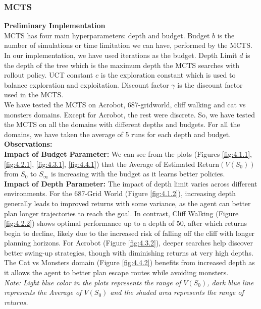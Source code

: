 \documentclass{article}
\begin{document}
\subsubsection{MCTS}
\textbf{Preliminary Implementation}\\

MCTS has four main hyperparameters: depth and budget. 
Budget $b$ is the number of simulations or time limitation we can have, performed by the MCTS. In our implementation, we have used iterations as the budget. 
Depth Limit $d$ is the depth of the tree which is the maximum depth the MCTS searches with rollout policy.
UCT constant $c$ is the exploration constant which is used to balance exploration and exploitation.
Discount factor $\gamma$ is the discount factor used in the MCTS.\\

We have tested the MCTS on Acrobot, 687-gridworld, cliff walking and cat vs monsters domains. Except for Acrobot, the rest were discrete. 
So, we have tested the MCTS on all the domains with different depths and budgets.
For all the domains, we have taken the average of 5 runs for each depth and budget. \\

\textbf{Observations:}\\
\textbf{Impact of Budget Parameter:}
We can see from the plots (Figures \ref{fig:4.1.1}, \ref{fig:4.2.1}, \ref{fig:4.3.1}, \ref{fig:4.4.1}) that the Average of Estimated Return$(V(S_0))$ from $S_0$ to $S_{\infty}$ is increasing with the budget as it learns better policies.\\

\textbf{Impact of Depth Parameter:}
The impact of depth limit varies across different environments. For the 687-Grid World (Figure \ref{fig:4.1.2}), increasing depth generally leads to improved returns with some variance, as the agent can better plan longer trajectories to reach the goal. 
In contrast, Cliff Walking (Figure \ref{fig:4.2.2}) shows optimal performance up to a depth of 50, after which returns begin to decline, likely due to the increased risk of falling off the cliff with longer planning horizons. 
For Acrobot (Figure \ref{fig:4.3.2}), deeper searches help discover better swing-up strategies, though with diminishing returns at very high depths. The Cat vs Monsters domain (Figure \ref{fig:4.4.2}) benefits from increased depth as it allows the agent to better plan escape routes while avoiding monsters.\\

\textit{Note: Light blue color in the plots represents the range of $V(S_0)$, dark blue line represents the Average of $V(S_0)$ and the shaded area represents the range of returns.}
\end{document}

